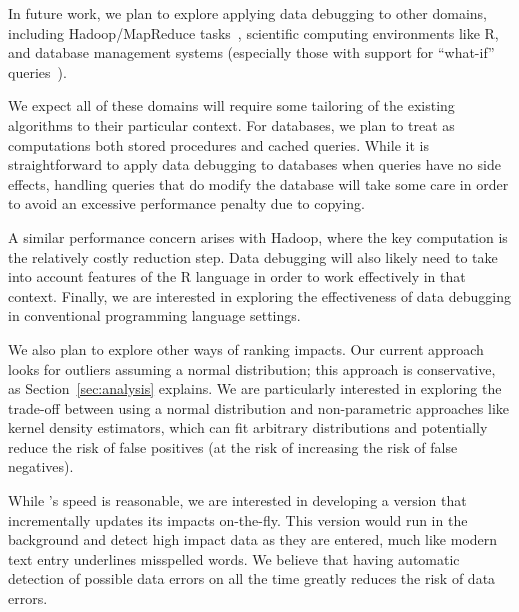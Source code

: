 In future work, we plan to explore applying data debugging to other
domains, including Hadoop/MapReduce tasks~\cite{dean2008mapreduce,hadoop}, scientific
computing environments like R, and database management systems (especially those with
support for ``what-if'' queries~\cite{Balmin:2000:HQO:645926.672016}).

We expect all of these domains will require some tailoring of the
existing algorithms to their particular context. For databases, we
plan to treat as computations both stored procedures and cached
queries. While it is straightforward to apply data debugging to
databases when queries have no side effects, handling queries that do
modify the database will take some care in order to avoid an excessive
performance penalty due to copying.

A similar performance concern arises with Hadoop, where the key
computation is the relatively costly reduction step. Data debugging
will also likely need to take into account features of the R language
in order to work effectively in that context. Finally, we are
interested in exploring the effectiveness of data debugging in
conventional programming language settings.

We also plan to explore other ways of ranking impacts. Our current
approach looks for outliers assuming a normal distribution; this
approach is conservative, as Section~\ref{sec:analysis} explains. We
are particularly interested in exploring the trade-off between using a
normal distribution and non-parametric approaches like kernel
density estimators, which can fit arbitrary distributions and
potentially reduce the risk of false positives (at the risk of
increasing the risk of false negatives).

While \checkcell{}'s speed is reasonable, we are interested in
developing a version that incrementally updates its impacts
on-the-fly. This version would run in the background and detect high
impact data as they are entered, much like modern text entry
underlines misspelled words. We believe that having automatic
detection of possible data errors on all the time greatly reduces
the risk of data errors.
